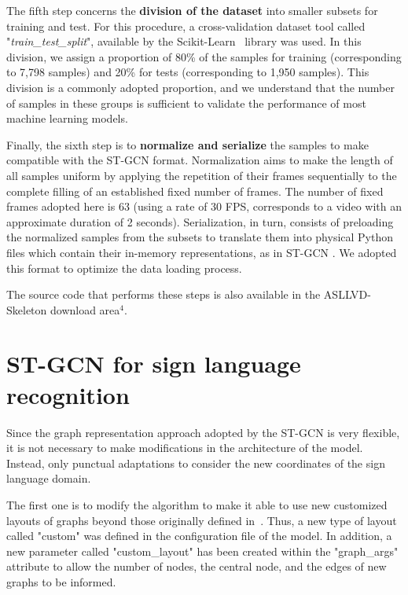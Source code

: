 \vspace{-4mm}

The fifth step concerns the \textbf{division of the dataset} into smaller subsets for training and test. For this procedure, a cross-validation dataset tool called "\textit{train\_test\_split}", available by the Scikit-Learn~\cite{scikit-learn} library was used. In this division, we assign a proportion of 80\% of the samples for training (corresponding to 7,798 samples) and 20\% for tests (corresponding to 1,950 samples). This division is a commonly adopted proportion, and we understand that the number of samples in these groups is sufficient to validate the performance of most machine learning models.

Finally, the sixth step is to \textbf{normalize and serialize} the samples to make compatible with the ST-GCN format. Normalization aims to make the length of all samples uniform by applying the repetition of their frames sequentially to the complete filling of an established fixed number of frames. The number of fixed frames adopted here is 63 (using a rate of 30 FPS, corresponds to a video with an approximate duration of 2 seconds). Serialization, in turn, consists of preloading the normalized samples from the subsets to translate them into physical Python files which contain their in-memory representations, as in ST-GCN \cite{st-gcn-2018}. We adopted this format to optimize the data loading process. %

The source code that performs these steps is also available in the ASLLVD-Skeleton download area$^4$.\\[-8mm]


\section{ST-GCN for sign language recognition} 
\label{sec:st-gcn-for-sl-recognition}

Since the graph representation approach adopted by the ST-GCN is very flexible, it is not necessary to make modifications in the architecture of the model. Instead, only punctual adaptations to consider the new coordinates of the sign language domain.

The first one is to modify the algorithm to make it able to use new customized layouts of graphs beyond those originally defined in~\cite{st-gcn-2018}. Thus, a new type of layout called "custom" was defined in the configuration file of the model. In addition, a new parameter called "custom\_layout" has been created within the "graph\_args" attribute to allow the number of nodes, the central node, and the edges of new graphs to be informed.

